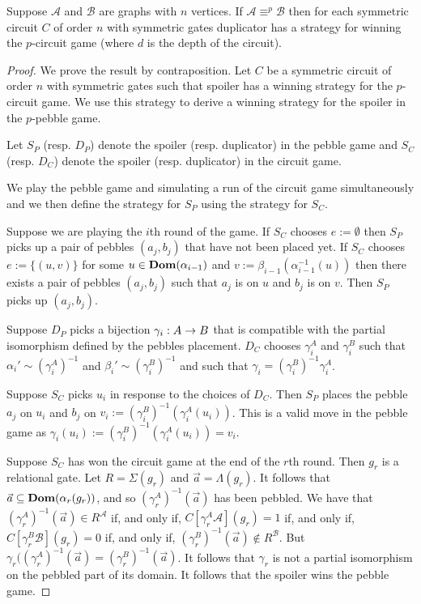 \documentclass[../main/thesis.tex]{subfiles}
\begin{document}
\begin{lem}
  Suppose $\mathcal{A}$ and $\mathcal{B}$ are graphs with $n$ vertices. If
  $\mathcal{A} \equiv^{p} \mathcal{B}$ then for each symmetric circuit $C$ of
  order $n$ with symmetric gates duplicator has a strategy for winning the
  $p$-circuit game (where $d$ is the depth of the circuit).
  \label{lem:pebble-to-circuit-games}
\end{lem}
\begin{proof}
  We prove the result by contraposition. Let $C$ be a symmetric circuit of order
  $n$ with symmetric gates such that spoiler has a winning strategy for the
  $p$-circuit game. We use this strategy to derive a winning strategy for the
  spoiler in the $p$-pebble game.

  Let $S_P$ (resp. $D_P$) denote the spoiler (resp. duplicator) in the pebble
  game and $S_C$ (resp. $D_C$) denote the spoiler (resp. duplicator) in the
  circuit game.

  We play the pebble game and simulating a run of the circuit game
  simultaneously and we then define the strategy for $S_P$ using the strategy
  for $S_C$.

  Suppose we are playing the $i$th round of the game. If $S_C$ chooses $e :=
  \emptyset$ then $S_P$ picks up a pair of pebbles $(a_j, b_j)$ that have not
  been placed yet. If $S_C$ chooses $e := \{(u,v)\}$ for some $u \in
  \text{\textbf{Dom}}(\alpha_{i-1})$ and $v := \beta_{i-1} (\alpha^{-1}_{i-1} (u))$ then there
  exists a pair of pebbles $(a_{j}, b_{j})$ such that $a_{j}$ is on $u$ and
  $b_{j}$ is on $v$. Then $S_P$ picks up $(a_{j}, b_{j})$.

  Suppose $D_P$ picks a bijection $\gamma_i : A \rightarrow B$ that is compatible with
  the partial isomorphism defined by the pebbles placement. $D_C$ chooses
  $\gamma^A_{i}$ and $\gamma^B_{i}$ such that $\alpha_i' \sim (\gamma^A_i)^{-1}$
  and $\beta_i' \sim (\gamma^B_i)^{-1}$ and such that $\gamma_i =
  (\gamma^B_i)^{-1}\gamma^A_i$.

  Suppose $S_C$ picks $u_i$ in response to the choices of $D_C$. Then $S_P$
  places the pebble $a_{j}$ on $u_i$ and $b_{j}$ on $v_i :=
  (\gamma^B_i)^{-1}(\gamma^A_i(u_i))$. This is a valid move in the pebble game
  as $\gamma_i (u_i) := (\gamma^B_i)^{-1}(\gamma^A_i(u_i)) = v_i$.

  Suppose $S_C$ has won the circuit game at the end of the $r$th round. Then
  $g_r$ is a relational gate. Let $R = \Sigma (g_r)$ and $\vec{a} =
  \Lambda(g_r)$. It follows that $\vec{a} \subseteq \text{\textbf{Dom}}(\alpha_r(g_r))$, and so
  $(\gamma^A_r)^{-1}(\vec{a})$ has been pebbled. We have that
  $(\gamma^A_{r})^{-1}(\vec{a}) \in R^{\mathcal{A}}$ if, and only if,
  $C[\gamma^A_r \mathcal{A}] (g_r) = 1$ if, and only if, $C[\gamma^B_r
  \mathcal{B}](g_r) = 0$ if, and only if, $(\gamma^B_{r})^{-1}(\vec{a}) \not\in
  R^{\mathcal{B}}$. But $\gamma_r ((\gamma^A_{r})^{-1}(\vec{a}) =
  (\gamma^B_{r})^{-1}(\vec{a})$. It follows that $\gamma_r$ is not a partial
  isomorphism on the pebbled part of its domain. It follows that the spoiler
  wins the pebble game.



\end{proof}
\end{document}
